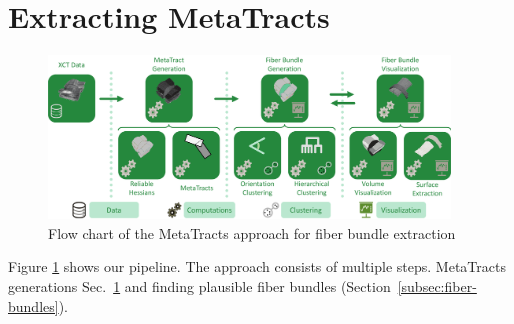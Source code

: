 


\section {Extracting MetaTracts }
\label{sec:approach}

\begin{figure}[tb]
\centering
\includegraphics[width=0.95\textwidth]{imagesMT2014/workflow.pdf}
\caption{Flow chart of the MetaTracts approach for fiber bundle extraction}
\label{fig:flowchart}
\end{figure}

Figure \ref{fig:flowchart} shows our pipeline. The approach consists of multiple steps. MetaTracts generations Sec.~\ref{sec:approach} and  finding plausible fiber bundles (Section~\ref{subsec:fiber-bundles}).



